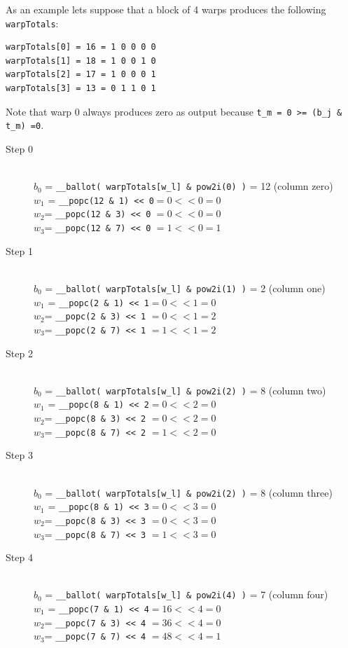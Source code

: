 As an example lets suppose that a block of 4 warps produces the following \verb|warpTotals|:

\begin{verbatim}
warpTotals[0] = 16 = 1 0 0 0 0 
warpTotals[1] = 18 = 1 0 0 1 0
warpTotals[2] = 17 = 1 0 0 0 1
warpTotals[3] = 13 = 0 1 1 0 1
\end{verbatim}
Note that warp $0$ always produces zero as output because \verb|t_m = 0 >= (b_j & t_m) =0|.

\begin{description}
\item[Step 0]\hfill \\
	\(b_0\) = \verb|__ballot( warpTotals[w_l] & pow2i(0) )| = 12 (column zero)\\
	\(w_1\) = \verb|__popc(12 & 1) << 0|$ = 0 << 0 = 0$\\
	\(w_2\)= \verb|__popc(12 & 3) << 0| $= 0 << 0  = 0$\\
	\(w_3\)= \verb|__popc(12 & 7) << 0| $= 1 << 0  = 1$\\
	
	\item[Step 1]\hfill \\
	\(b_0\) = \verb|__ballot( warpTotals[w_l] & pow2i(1) )| = 2 (column one)\\
	\(w_1\) = \verb|__popc(2 & 1) << 1|$ = 0 << 1 = 0$\\
	\(w_2\)= \verb|__popc(2 & 3) << 1| $= 0 << 1  = 2$\\
	\(w_3\)= \verb|__popc(2 & 7) << 1| $= 1 << 1  = 2$\\
	
	
	\item[Step 2]\hfill \\
	\(b_0\) = \verb|__ballot( warpTotals[w_l] & pow2i(2) )| = 8 (column two)\\
	\(w_1\) = \verb|__popc(8 & 1) << 2|$ = 0 << 2 = 0$\\
	\(w_2\)= \verb|__popc(8 & 3) << 2| $= 0 << 2 = 0$\\
	\(w_3\)= \verb|__popc(8 & 7) << 2| $= 1 << 2  = 0$\\
	
		\item[Step 3]\hfill \\
	\(b_0\) = \verb|__ballot( warpTotals[w_l] & pow2i(2) )| = 8 (column three)\\
	\(w_1\) = \verb|__popc(8 & 1) << 3|$ = 0 << 3 = 0$\\
	\(w_2\)= \verb|__popc(8 & 3) << 3| $= 0 << 3  = 0$\\
	\(w_3\)= \verb|__popc(8 & 7) << 3| $= 1 << 3  = 0$\\
	
	
	\item[Step 4]\hfill \\
	\(b_0\) = \verb|__ballot( warpTotals[w_l] & pow2i(4) )| = 7 (column four)\\
	\(w_1\) = \verb|__popc(7 & 1) << 4|$ = 16 << 4 =0$\\
	\(w_2\)= \verb|__popc(7 & 3) << 4| $= 36 << 4 =0$\\
	\(w_3\)= \verb|__popc(7 & 7) << 4| $= 48 << 4 =1$\\
	
\end{description}

